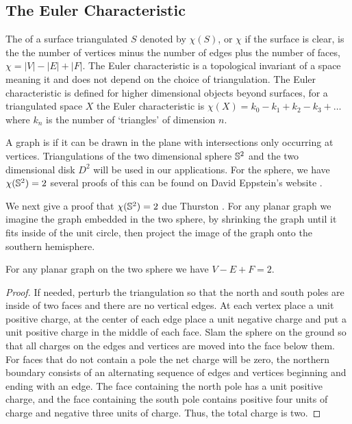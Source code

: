 \subsection{The Euler Characteristic}

The  of a surface triangulated $S$ denoted by $\chi(S)$, or $\chi$
 if the surface is clear,  is the 
the number of vertices minus the number of edges plus  the number of faces, $\chi=|V|-|E|+|F|.$
The Euler characteristic is a topological invariant of a space meaning it
and does not depend on the choice of triangulation.
The Euler characteristic is defined for higher dimensional objects beyond surfaces,
 for a triangulated space $X$ the Euler characteristic is 
$\chi(X)=k_0-k_1+k_2-k_3+\ldots$ where $k_n$ is the number of `triangles' of dimension $n.$



A  graph  is  if it can be drawn in the plane with intersections only occurring
at vertices.
Triangulations of the two dimensional sphere $\mathbb{S}^2$ and the two dimensional disk $D^2$ 
will be used in our applications.
For the sphere, we have $\chi(\mathbb{S}^2)=2$ 
several proofs of this can be found on David Eppstein's website \cite{eppstein-proofs}.




We next give a proof that $\chi(\mathbb{S}^2)=2$ due Thurston \cite{thurston}. 
For any planar graph we imagine the graph embedded in the two sphere, by
shrinking the graph until it fits inside of the unit circle, then project the image of the graph
onto the southern hemisphere.  

\begin{theorem}\label{thm:euler}
For any planar graph on the two sphere we have $V-E+F=2.$
\end{theorem}

\begin{proof}
If needed, perturb the triangulation so that the north and south poles are 
inside of  two faces and there are no vertical edges. At each vertex place a unit positive
charge, at the center of each edge place a unit negative charge and put a unit positive
charge in the middle of each face. Slam the sphere on the ground so that all charges
on the edges and vertices are moved into the face below them. For faces that do not contain a pole
the net charge will be zero, the northern boundary consists of an alternating sequence
of edges and vertices  beginning  and ending with an edge.
The face containing the north pole has a unit positive charge, and the face containing the south
pole contains positive four units of charge and negative three units of charge.
Thus, the total charge is two.

\end{proof}

